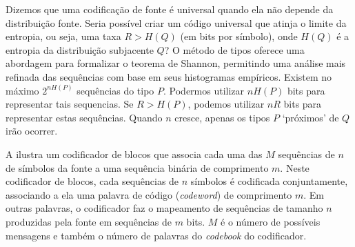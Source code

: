 Dizemos que uma codificação de fonte é universal quando ela não depende da distribuição fonte.
Seria possível criar um código universal que atinja o limite da entropia, ou seja, uma taxa $R>H(Q)$
(em bits por símbolo), onde $H(Q)$ é a entropia da distribuição subjacente $Q$?
O método de tipos oferece uma abordagem para formalizar o teorema de Shannon, 
permitindo uma análise mais refinada das sequências com base em seus histogramas empíricos.
Existem no máximo $2^{nH(P)}$ sequências do tipo $P$. Podermos utilizar $nH(P)$ bits para
representar tais sequencias. Se $R > H(P)$, podemos utilizar $nR$ bits para representar estas sequências.
Quando $n$ cresce, apenas os tipos $P$ `próximos' de $Q$ irão ocorrer.

A  ilustra um codificador de blocos que associa cada uma das $M$ sequências de $n$ de símbolos
da fonte a uma sequência binária de comprimento $m$.
Neste codificador de blocos, cada sequências de $n$ símbolos é codificada conjuntamente,
associando a ela uma palavra de código (\textit{codeword}) de comprimento $m$. 
Em outras palavras, o codificador faz o mapeamento de sequências de tamanho $n$ produzidas pela fonte em
sequências de $m$ bits.
$M$ é o número de possíveis mensagens e também o número de palavras do \emph{codebook} do codificador.
